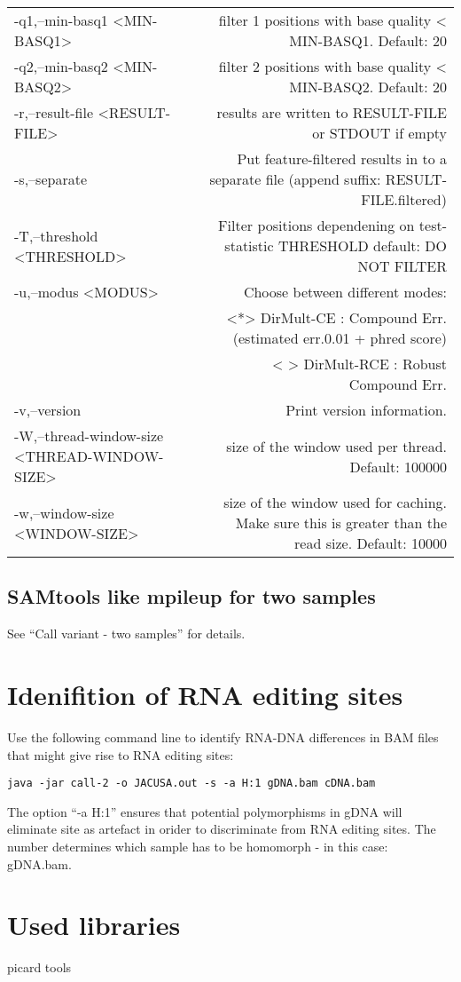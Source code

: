 \documentclass[12pt, a4paper]{article}
\begin{document}
\begin{table}
\begin{tabular}{lr}
 -q1,--min-basq1 <MIN-BASQ1>                    & filter 1 positions with base quality < MIN-BASQ1. Default: 20 \\
 -q2,--min-basq2 <MIN-BASQ2>                    & filter 2 positions with base quality < MIN-BASQ2. Default: 20 \\
 -r,--result-file <RESULT-FILE>                 & results are written to RESULT-FILE or STDOUT if empty \\
 -s,--separate                                  & Put feature-filtered results in to a separate file (append suffix: RESULT-FILE.filtered)\\
 -T,--threshold <THRESHOLD>                     & Filter positions dependening on test-statistic THRESHOLD default: DO NOT FILTER \\
 -u,--modus <MODUS>                             & Choose between different modes: \\
                                                & <*> DirMult-CE : Compound Err. (estimated err.{0.01} + phred score) \\
                                                & < > DirMult-RCE : Robust Compound Err. \\
 -v,--version                                   & Print version information. \\
 -W,--thread-window-size <THREAD-WINDOW-SIZE>   & size of the window used per thread. Default: 100000 \\
 -w,--window-size <WINDOW-SIZE>                 & size of the window used for caching. Make sure this is greater than the read size. Default: 10000 \\
\end{tabular}
\end{table}
\subsection{SAMtools like mpileup for two samples}
See ``Call variant - two samples'' for details.
\section{Idenifition of RNA editing sites}
Use the following command line to identify RNA-DNA differences in BAM files that might give rise to RNA editing sites:
\begin{verbatim}
java -jar call-2 -o JACUSA.out -s -a H:1 gDNA.bam cDNA.bam
\end{verbatim}
The option ``-a H:1'' ensures that potential polymorphisms in gDNA will eliminate site as artefact in orider to discriminate from RNA editing sites. The number
determines which sample has to be homomorph - in this case: gDNA.bam.
\section{Used libraries}
picard tools
\end{document}

